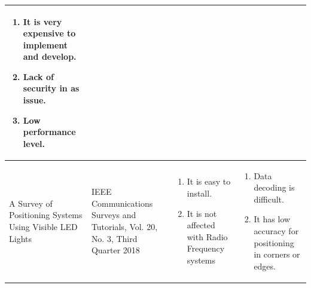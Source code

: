 ﻿\documentclass[a4paper, 12pt]{article}
\begin{document}
\begin{tabular}{|p{107pt}|p{107pt}|p{107pt}|p{107pt}|}
	\parbox{107pt}{\raggedright 
		\begin{enumerate}
			\item It is very expensive to implement and develop.
			\item Lack of security in as issue.
			\item Low performance level.
		\end{enumerate}
	} \\
	\hline
	\parbox{107pt}{\raggedright A Survey of Positioning Systems Using Visible LED Lights} & 
	\parbox{107pt}{\raggedright IEEE Communications Surveys and Tutorials, Vol. 20, No. 3, Third Quarter 2018} & 
	\parbox{107pt}{\raggedright 
		\begin{enumerate}
			\item It is easy to install.
			\item It is not affected with Radio Frequency systems
		\end{enumerate}
	} & \parbox{107pt}{\raggedright 
		\begin{enumerate}
			\item Data decoding is difficult.
			\item It has low accuracy for positioning in corners or edges.
	\end{enumerate}} \\
	\hline
\end{tabular}
\vspace{2pt}

\pagebreak
\end{document}
